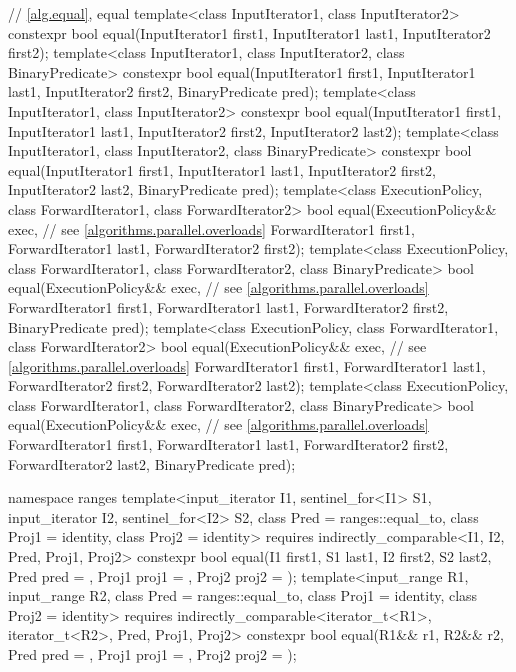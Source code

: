 \begin{codeblock}
{  // \ref{alg.equal}, equal
  template<class InputIterator1, class InputIterator2>
    constexpr bool equal(InputIterator1 first1, InputIterator1 last1,
                         InputIterator2 first2);
  template<class InputIterator1, class InputIterator2, class BinaryPredicate>
    constexpr bool equal(InputIterator1 first1, InputIterator1 last1,
                         InputIterator2 first2, BinaryPredicate pred);
  template<class InputIterator1, class InputIterator2>
    constexpr bool equal(InputIterator1 first1, InputIterator1 last1,
                         InputIterator2 first2, InputIterator2 last2);
  template<class InputIterator1, class InputIterator2, class BinaryPredicate>
    constexpr bool equal(InputIterator1 first1, InputIterator1 last1,
                         InputIterator2 first2, InputIterator2 last2,
                         BinaryPredicate pred);
  template<class ExecutionPolicy, class ForwardIterator1, class ForwardIterator2>
    bool equal(ExecutionPolicy&& exec,                          // see \ref{algorithms.parallel.overloads}
               ForwardIterator1 first1, ForwardIterator1 last1,
               ForwardIterator2 first2);
  template<class ExecutionPolicy, class ForwardIterator1, class ForwardIterator2,
           class BinaryPredicate>
    bool equal(ExecutionPolicy&& exec,                          // see \ref{algorithms.parallel.overloads}
               ForwardIterator1 first1, ForwardIterator1 last1,
               ForwardIterator2 first2, BinaryPredicate pred);
  template<class ExecutionPolicy, class ForwardIterator1, class ForwardIterator2>
    bool equal(ExecutionPolicy&& exec,                          // see \ref{algorithms.parallel.overloads}
               ForwardIterator1 first1, ForwardIterator1 last1,
               ForwardIterator2 first2, ForwardIterator2 last2);
  template<class ExecutionPolicy, class ForwardIterator1, class ForwardIterator2,
           class BinaryPredicate>
    bool equal(ExecutionPolicy&& exec,                          // see \ref{algorithms.parallel.overloads}
               ForwardIterator1 first1, ForwardIterator1 last1,
               ForwardIterator2 first2, ForwardIterator2 last2,
               BinaryPredicate pred);

  namespace ranges {
    template<input_iterator I1, sentinel_for<I1> S1, input_iterator I2, sentinel_for<I2> S2,
             class Pred = ranges::equal_to, class Proj1 = identity, class Proj2 = identity>
      requires indirectly_comparable<I1, I2, Pred, Proj1, Proj2>
      constexpr bool equal(I1 first1, S1 last1, I2 first2, S2 last2,
                           Pred pred = {},
                           Proj1 proj1 = {}, Proj2 proj2 = {});
    template<input_range R1, input_range R2, class Pred = ranges::equal_to,
             class Proj1 = identity, class Proj2 = identity>
      requires indirectly_comparable<iterator_t<R1>, iterator_t<R2>, Pred, Proj1, Proj2>
      constexpr bool equal(R1&& r1, R2&& r2, Pred pred = {},
                           Proj1 proj1 = {}, Proj2 proj2 = {});
  }

}
\end{codeblock}
